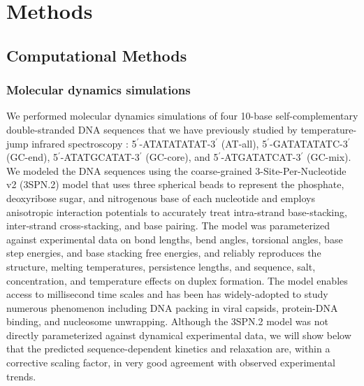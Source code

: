 \documentclass[journal=jpcbfk,manuscript=article]{achemso}
\begin{document}
\section{\label{sec:methods}Methods}

\subsection{Computational Methods}

\subsubsection{Molecular dynamics simulations}

We performed molecular dynamics simulations of four 10-base self-complementary double-stranded DNA sequences that we have previously studied by temperature-jump infrared spectroscopy \citep{Sanstead2016}: 5$^\prime$-ATATATATAT-3$^\prime$ (AT-all), 5$^\prime$-GATATATATC-3$^\prime$ (GC-end), 5$^\prime$-ATATGCATAT-3$^\prime$ (GC-core), and  5$^\prime$-ATGATATCAT-3$^\prime$ (GC-mix). We modeled the DNA sequences using the coarse-grained 3-Site-Per-Nucleotide v2 (3SPN.2) model that uses three spherical beads to represent the phosphate, deoxyribose sugar, and nitrogenous base of each nucleotide and employs anisotropic interaction potentials to accurately treat intra-strand base-stacking, inter-strand cross-stacking, and base pairing. \citep{Hinckley2013AnHybridization} The model was parameterized against experimental data on bond lengths, bend angles, torsional angles, base step energies, and base stacking free energies, and reliably reproduces the structure, melting temperatures, persistence lengths, and sequence, salt, concentration, and temperature effects on duplex formation. \citep{Hinckley2013AnHybridization} The model enables access to millisecond time scales and has been has widely-adopted to study numerous phenomenon including DNA packing in viral capsids, protein-DNA binding, and nucleosome unwrapping.\citep{Cordoba2017AIons, Lu2020OpenAWSEMSimulations, Lequieu2016Tension-dependentUnwrapping} Although the 3SPN.2 model was not directly parameterized against dynamical experimental data, we will show below that the predicted sequence-dependent kinetics and relaxation are, within a corrective scaling factor, in very good agreement with observed experimental trends.
\end{document}
